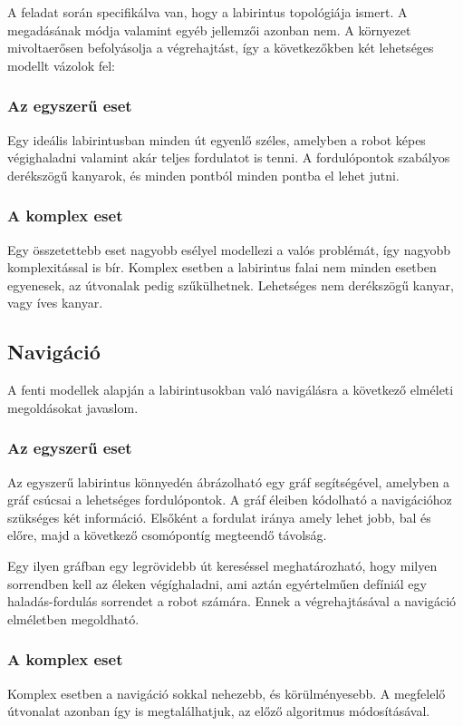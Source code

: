 A feladat során specifikálva van, hogy a labirintus topológiája ismert. A
megadásának módja valamint egyéb jellemzői azonban nem. A környezet mivoltaerősen
befolyásolja a végrehajtást, így a következőkben két lehetséges modellt vázolok
fel:

\subsubsection{Az egyszerű eset}
Egy ideális labirintusban minden út egyenlő széles, amelyben a robot képes
végighaladni valamint akár teljes fordulatot is tenni. A fordulópontok szabályos
derékszögű kanyarok, és minden pontból minden pontba el lehet jutni.

\subsubsection{A komplex eset}
Egy összetettebb eset nagyobb esélyel modellezi a valós problémát, így nagyobb
komplexitással is bír. Komplex esetben a labirintus falai nem minden esetben
egyenesek, az útvonalak pedig szűkülhetnek. Lehetséges nem derékszögű kanyar,
vagy íves kanyar. 

\subsection{Navigáció}

A fenti modellek alapján a labirintusokban való navigálásra a következő elméleti
megoldásokat javaslom.

\subsubsection{Az egyszerű eset}
Az egyszerű labirintus könnyedén ábrázolható egy gráf segítségével, amelyben a
gráf csúcsai a lehetséges fordulópontok. A gráf éleiben kódolható a navigációhoz
szükséges két információ. Elsőként a fordulat iránya amely lehet  jobb, bal és
előre, majd a következő csomópontíg megteendő távolság.

Egy ilyen gráfban egy legrövidebb út kereséssel meghatározható, hogy milyen
sorrendben kell az éleken végíghaladni, ami aztán egyértelműen defíniál egy
haladás-fordulás sorrendet a robot számára. Ennek a végrehajtásával a navigáció 
elméletben megoldható.

\subsubsection{A komplex eset}
Komplex esetben a navigáció sokkal nehezebb, és körülményesebb. A megfelelő
útvonalat azonban így is megtalálhatjuk, az előző algoritmus módosításával.

